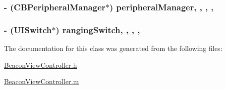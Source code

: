 \subsubsection[{peripheral\+Manager}]{\setlength{\rightskip}{0pt plus 5cm}-\/ (C\+B\+Peripheral\+Manager$\ast$) peripheral\+Manager\hspace{0.3cm}{\ttfamily [read]}, {\ttfamily [write]}, {\ttfamily [nonatomic]}, {\ttfamily [strong]}, {\ttfamily [implementation]}}\label{interface_beacon_view_controller_a73b87fab61673b3d597e472076f064c4}
\hypertarget{interface_beacon_view_controller_a0b9ecc9bde1f59fe377c9346ab48e1bc}{}
\subsubsection[{ranging\+Switch}]{\setlength{\rightskip}{0pt plus 5cm}-\/ (U\+I\+Switch$\ast$) ranging\+Switch\hspace{0.3cm}{\ttfamily [read]}, {\ttfamily [write]}, {\ttfamily [nonatomic]}, {\ttfamily [weak]}, {\ttfamily [implementation]}}\label{interface_beacon_view_controller_a0b9ecc9bde1f59fe377c9346ab48e1bc}


The documentation for this class was generated from the following files\+:\begin{DoxyCompactItemize}
\item 
\hyperlink{_beacon_view_controller_8h}{Beacon\+View\+Controller.\+h}\item 
\hyperlink{_beacon_view_controller_8m}{Beacon\+View\+Controller.\+m}\end{DoxyCompactItemize}
